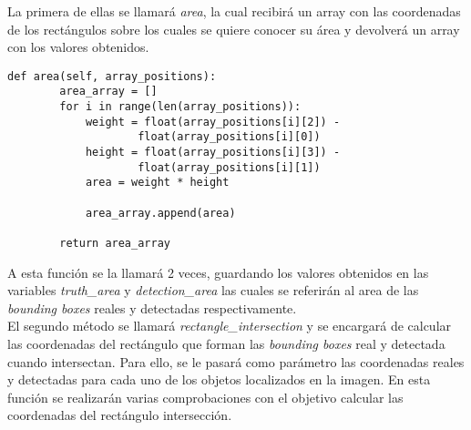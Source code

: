 \documentclass[a4paper, 12pt, oneside]{book}
\begin{document}
La primera de ellas se llamará \textit{area}, la cual recibirá un array con las coordenadas de los rectángulos sobre los cuales se quiere conocer su área y devolverá un array con los valores obtenidos.\\

\begin{lstlisting}[frame=single]
    def area(self, array_positions):
        area_array = []
        for i in range(len(array_positions)):
            weight = float(array_positions[i][2]) - 
            		float(array_positions[i][0])
            height = float(array_positions[i][3]) -
            		float(array_positions[i][1])
            area = weight * height
         
            area_array.append(area)
            
        return area_array
\end{lstlisting}

A esta función se la llamará 2 veces, guardando los valores obtenidos en las variables \textit{truth\_area} y \textit{detection\_area} las cuales se referirán al area de las \textit{bounding boxes} reales y detectadas respectivamente.\\

El segundo método se llamará \textit{rectangle\_intersection} y se encargará de calcular las coordenadas del rectángulo que forman las \textit{bounding boxes} real y detectada cuando intersectan. Para ello, se le pasará como parámetro las coordenadas reales y detectadas para cada uno de los objetos localizados en la imagen. En esta función se realizarán varias comprobaciones con el objetivo calcular las coordenadas del rectángulo intersección.\\
\end{document}
